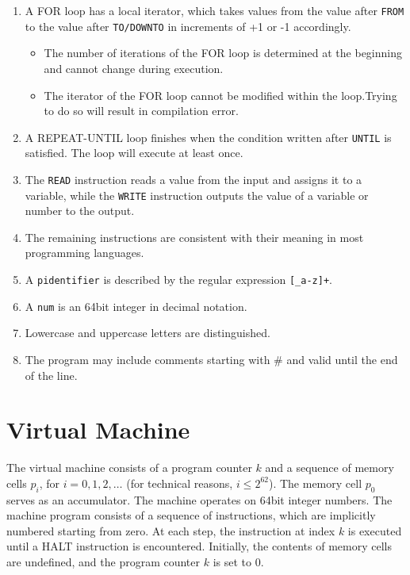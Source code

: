 \documentclass{article}
\begin{document}
\begin{enumerate}
    \item A FOR loop has a local iterator, which takes values from the value after \texttt{FROM} to the value after \texttt{TO/DOWNTO} in increments of +1 or -1 accordingly.
    \begin{itemize}
        \item The number of iterations of the FOR loop is determined at the beginning and cannot change during execution.
        \item The iterator of the FOR loop cannot be modified within the loop.Trying to do so will result in compilation error.
    \end{itemize}

    \item A REPEAT-UNTIL loop finishes when the condition written after \texttt{UNTIL} is satisfied. The loop will execute at least once.

    \item The \texttt{READ} instruction reads a value from the input and assigns it to a variable, while the \texttt{WRITE} instruction outputs the value of a variable or number to the output.

    \item The remaining instructions are consistent with their meaning in most programming languages.

    \item A \texttt{pidentifier} is described by the regular expression \texttt{[\_a-z]+}.
    
    \item A \texttt{num} is an 64bit integer in decimal notation. 

    \item Lowercase and uppercase letters are distinguished.

    \item The program may include comments starting with \# and valid until the end of the line.
\end{enumerate}

\section*{Virtual Machine}

The virtual machine consists of a program counter $k$ and a sequence of memory cells $p_i$, for $i = 0, 1, 2, \dots$ (for technical reasons, $i \leq 2^{62}$). The memory cell $p_0$ serves as an accumulator. The machine operates on 64bit integer numbers. The machine program consists of a sequence of instructions, which are implicitly numbered starting from zero. At each step, the instruction at index $k$ is executed until a HALT instruction is encountered. Initially, the contents of memory cells are undefined, and the program counter $k$ is set to 0.
\end{document}
